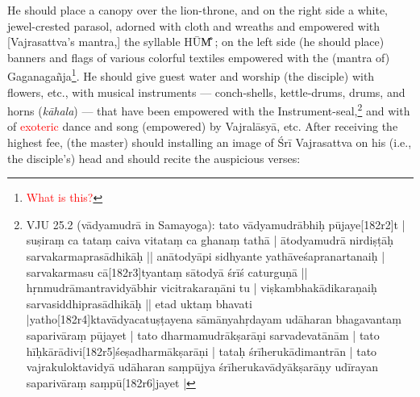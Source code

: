 \documentclass[11pt]{book}
\makeatletter
\def\fakesc#1{%
  \begingroup%
  \xdef\fake@name{\csname\curr@fontshape/\f@size\endcsname}%
  \fontsize{1.3\fontdimen8\fake@name}{\baselineskip}\selectfont%
  \uppercase{#1}%
  \endgroup%
}
\newcommand{\mantra}[1]{\fakesc{#1}}
\newcommand{\red}[1]{\textcolor{red}{#1}}
\makeatother
\begin{document}
He should place a canopy over the lion-throne, and on the right side a white, jewel-crested parasol, adorned with cloth and wreaths and empowered with [Vajrasattva's mantra,] the syllable \mantra{hūm̐}; on the left side (he should place) banners and flags of various colorful textiles empowered with the (mantra of) Gaganagañja\footnote{\red{What is this?}
}. He should give guest water and worship (the disciple) with flowers, etc., with musical instruments — conch-shells, kettle-drums, drums, and horns (\emph{kāhala}) — that have been empowered with the Instrument-seal,\footnote{VJU 25.2 (vādyamudrā in Samayoga): tato vādyamudrābhiḥ pūjaye[182r2]t | suṣiraṃ ca tataṃ caiva vitataṃ ca ghanaṃ tathā | ātodyamudrā nirdiṣṭāḥ sarvakarmaprasādhikāḥ || anātodyāpi sidhyante yathāveśapranartanaiḥ | sarvakarmasu cā[182r3]tyantaṃ sātodyā śrīś caturguṇā || hṛnmudrāmantravidyābhir vicitrakaraṇāni tu | viṣkambhakādikaraṇaiḥ sarvasiddhiprasādhikāḥ || etad uktaṃ bhavati |yatho[182r4]ktavādyacatuṣṭayena sāmānyahṛdayam udāharan bhagavantaṃ saparivāraṃ pūjayet | tato dharmamudrākṣarāṇi sarvadevatānām | tato hīḥkārādivi[182r5]śeṣadharmākṣarāṇi | tataḥ śrīherukādimantrān | tato vajrakuloktavidyā udāharan saṃpūjya śrīherukavādyākṣarāṇy udīrayan saparivāraṃ saṃpū[182r6]jayet |}
 and with of \red{exoteric} dance and song (empowered) by Vajralāsyā, etc. After receiving the highest fee, (the master) should installing an image of Śrī Vajrasattva on his (i.e., the  disciple's) head and should recite the auspicious verses:
 
	
\end{document}
